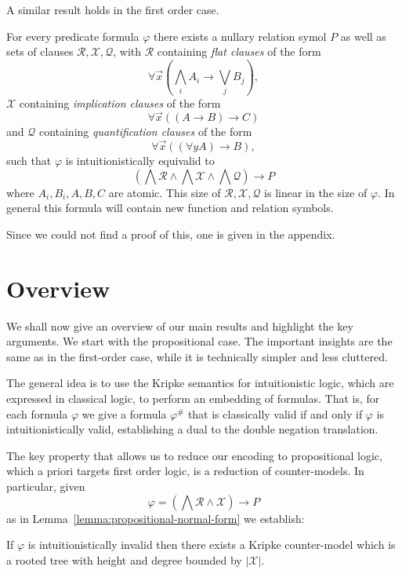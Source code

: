 \documentclass[runningheads]{llncs}
\begin{document}
A similar result holds in the first order case.

\begin{lemma}\label{lemma:first-order-normal-form}
	For every predicate formula $\varphi$ there exists a nullary relation symol $P$ as well as sets of clauses $\mathcal R,\mathcal X, \mathcal Q$, with $\mathcal R$ containing \emph{flat clauses} of the form
	$$\forall \vec x\left(\bigwedge_i A_i\to \bigvee_jB_j\right),$$
	$\mathcal X$ containing \emph{implication clauses} of the form
	$$\forall \vec x\left((A\to B)\to C\right)$$
	and $\mathcal Q$ containing \emph{quantification clauses} of the form
	$$\forall\vec x\left((\forall y A)\to B\right),$$
	such that $\varphi$ is intuitionistically equivalid to
	$$\left(\bigwedge\mathcal R\wedge\bigwedge \mathcal X\wedge\bigwedge\mathcal Q\right)\to P$$where $A_i, B_i, A, B, C$ are atomic. This size of $\mathcal R, \mathcal X, \mathcal Q$ is linear in the size of $\varphi$. In general this formula will contain new function and relation symbols.
\end{lemma}

Since we could not find a proof of this, one is given in the appendix.

\section{Overview}

We shall now give an overview of our main results and highlight the key arguments. We start with the propositional case. The important insights are the same as in the first-order case, while it is technically simpler and less cluttered.

The general idea is to use the Kripke semantics for intuitionistic logic, which are expressed in classical logic, to perform an embedding of formulas. That is, for each formula $\varphi$ we give a formula $\varphi^\#$ that is classically valid if and only if $\varphi$ is intuitionistically valid, establishing a dual to the double negation translation.

The key property that allows us to reduce our encoding to propositional logic, which a priori targets first order logic, is a reduction of counter-models. In particular, given $$\varphi = \left(\bigwedge\mathcal R\wedge\mathcal X\right)\to P$$ as in Lemma~\ref{lemma:propositional-normal-form} we establish:

\begin{lemma}
	If $\varphi$ is intuitionistically invalid then there exists a Kripke counter-model which is a rooted tree with height and degree bounded by $|\mathcal X|$.
\end{lemma}
\end{document}
